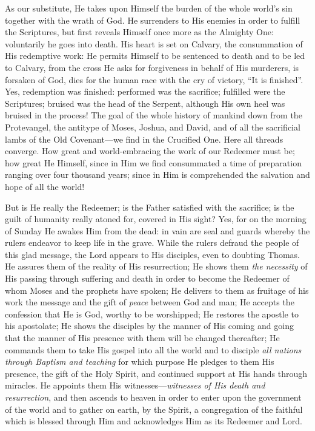 As our substitute, He takes upon Himself the burden of the whole world’s sin together with the wrath of God. He surrenders to His enemies in order to fulfill the Scriptures, but first reveals Himself once more as the Almighty One: voluntarily he goes into death. His heart is set on Calvary, the consummation of His redemptive work: He permits Himself to be sentenced to death and to be led to Calvary, from the cross He asks for forgiveness in behalf of His murderers, is forsaken of God, dies for the human race with the cry of victory, “It is finished”. Yes, redemption was finished: performed was the sacrifice; fulfilled were the Scriptures; bruised was the head of the Serpent, although
His own heel was bruised in the process! The goal of the whole history of mankind down from the Protevangel, the antitype of Moses, Joshua, and David, and of all the sacrificial lambs of the Old Covenant—we find in the Crucified One. Here all threads converge. How great and world-embracing the work of our Redeemer must be; how great He Himself, since in Him we find consummated a time of preparation ranging over four thousand years; since in Him is comprehended the salvation and hope of all the world!

But is He really the Redeemer; is the Father satisfied with the sacrifice; is the guilt of humanity really atoned for, covered in His sight? Yes, for on the morning of Sunday He awakes Him from the dead: in vain are seal and guards whereby the rulers endeavor to keep life in the grave. While the rulers defraud the people of this glad message, the Lord appears to His disciples, even to doubting Thomas. He assures them of the reality of His resurrection; He shows them \emph{the necessity} of His passing through suffering and death in order to become the Redeemer of whom Moses and the prophets have spoken; He delivers to them as fruitage of his work the message and the gift of \emph{peace} between God and man; He accepts the confession that He is God, worthy to be worshipped; He restores the apostle to his apostolate; He shows the disciples by the manner of His coming and going that the manner of His presence with them will be changed thereafter; He commands them to take His gospel into all the world and to disciple \emph{all nations through Baptism and teaching} for which purpose He pledges to them His presence, the gift of the Holy Spirit, and continued support at His hands through miracles. He appoints them His witnesses—\emph{witnesses of His death and resurrection}, and then ascends to heaven in order to enter upon the government of the world and to gather on earth, by the Spirit, a congregation of the faithful which is blessed through Him and acknowledges Him as its Redeemer and Lord.

